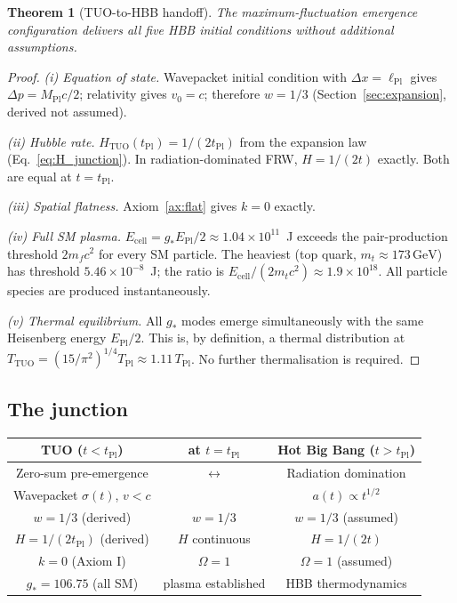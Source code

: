 \documentclass[12pt,a4paper]{article}
\newtheorem{theorem}{Theorem}[section]
\theoremstyle{definition}
\theoremstyle{remark}
\newcommand{\EPl}{E_{\mathrm{Pl}}}
\newcommand{\tPl}{t_{\mathrm{Pl}}}
\newcommand{\lPl}{\ell_{\mathrm{Pl}}}
\newcommand{\TPl}{T_{\mathrm{Pl}}}
\newcommand{\MPl}{M_{\mathrm{Pl}}}
\newcommand{\gstar}{g_{*}}
\newcommand{\TTUO}{T_{\mathrm{TUO}}}
\begin{document}
\begin{theorem}[TUO-to-HBB handoff]\label{thm:handoff}
The maximum-fluctuation emergence configuration delivers all five HBB
initial conditions without additional assumptions.
\end{theorem}
\begin{proof}
\textit{(i) Equation of state.}
Wavepacket initial condition with $\Delta x = \lPl$ gives
$\Delta p = \MPl c/2$; relativity gives $v_0 = c$; therefore $w = 1/3$
(Section~\ref{sec:expansion}, derived not assumed).

\textit{(ii) Hubble rate.}
$H_\mathrm{TUO}(\tPl) = 1/(2\tPl)$ from the expansion law
(Eq.~\eqref{eq:H_junction}). In radiation-dominated FRW, $H = 1/(2t)$
exactly. Both are equal at $t = \tPl$.

\textit{(iii) Spatial flatness.}
Axiom~\ref{ax:flat} gives $k = 0$ exactly.

\textit{(iv) Full SM plasma.}
$E_\mathrm{cell} = \gstar\EPl/2 \approx 1.04 \times 10^{11}$~J exceeds
the pair-production threshold $2m_fc^2$ for every SM particle.
The heaviest (top quark, $m_t \approx 173\,\mathrm{GeV}$) has threshold
$5.46 \times 10^{-8}$~J; the ratio is $E_\mathrm{cell}/(2m_tc^2)
\approx 1.9 \times 10^{18}$.
All particle species are produced instantaneously.

\textit{(v) Thermal equilibrium.}
All $\gstar$ modes emerge simultaneously with the same Heisenberg energy
$\EPl/2$. This is, by definition, a thermal distribution at
$\TTUO = (15/\pi^2)^{1/4}\TPl \approx 1.11\,\TPl$.
No further thermalisation is required.
\end{proof}

\subsection{The junction}

\begin{center}
\renewcommand{\arraystretch}{1.4}
\begin{tabular}{ccc}
\textbf{TUO} ($t < \tPl$) & \textbf{at $t = \tPl$} & \textbf{Hot Big Bang} ($t > \tPl$) \\
\hline
Zero-sum pre-emergence & $\longleftrightarrow$ & Radiation domination \\
Wavepacket $\sigma(t)$, $v<c$ & & $a(t) \propto t^{1/2}$ \\
$w = 1/3$ (derived) & $w = 1/3$ & $w = 1/3$ (assumed) \\
$H = 1/(2\tPl)$ (derived) & $H$ continuous & $H = 1/(2t)$ \\
$k = 0$ (Axiom I) & $\Omega = 1$ & $\Omega = 1$ (assumed) \\
$\gstar = 106.75$ (all SM) & plasma established & HBB thermodynamics \\
\hline
\end{tabular}
\renewcommand{\arraystretch}{1}
\end{center}
\end{document}
